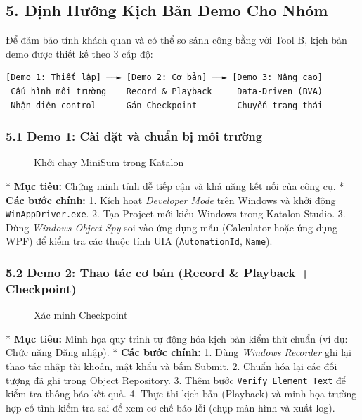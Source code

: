 {\subsection{5. Định Hướng Kịch Bản Demo Cho Nhóm}

Để đảm bảo tính khách quan và có thể so sánh công bằng với Tool B, kịch bản demo được thiết kế theo 3 cấp độ:

\begin{lstlisting}
[Demo 1: Thiết lập] ──► [Demo 2: Cơ bản] ──► [Demo 3: Nâng cao]
 Cấu hình môi trường    Record & Playback     Data-Driven (BVA)
 Nhận diện control      Gán Checkpoint        Chuyển trạng thái
\end{lstlisting}


\subsubsection{5.1 Demo 1: Cài đặt và chuẩn bị môi trường}

\begin{figure}[H]
\centering
\caption{Khởi chạy MiniSum trong Katalon}
\end{figure}

* \textbf{Mục tiêu:} Chứng minh tính dễ tiếp cận và khả năng kết nối của công cụ.
* \textbf{Các bước chính:}
  1. Kích hoạt \textit{Developer Mode} trên Windows và khởi động \texttt{WinAppDriver.exe}.
  2. Tạo Project mới kiểu Windows trong Katalon Studio.
  3. Dùng \textit{Windows Object Spy} soi vào ứng dụng mẫu (Calculator hoặc ứng dụng WPF) để kiểm tra các thuộc tính UIA (\texttt{AutomationId}, \texttt{Name}).

\subsubsection{5.2 Demo 2: Thao tác cơ bản (Record \& Playback + Checkpoint)}

\begin{figure}[H]
\centering
\caption{Xác minh Checkpoint}
\end{figure}

* \textbf{Mục tiêu:} Minh họa quy trình tự động hóa kịch bản kiểm thử chuẩn (ví dụ: Chức năng Đăng nhập).
* \textbf{Các bước chính:}
  1. Dùng \textit{Windows Recorder} ghi lại thao tác nhập tài khoản, mật khẩu và bấm Submit.
  2. Chuẩn hóa lại các đối tượng đã ghi trong Object Repository.
  3. Thêm bước \texttt{Verify Element Text} để kiểm tra thông báo kết quả.
  4. Thực thi kịch bản (Playback) và minh họa trường hợp cố tình kiểm tra sai để xem cơ chế báo lỗi (chụp màn hình và xuất log).

}
